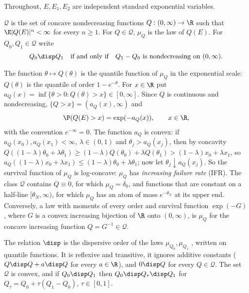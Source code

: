 Throughout, $E,E_1,E_2$ are independent standard exponential variables.

\begin{definition}\label{def:existence-Q}
$\mathcal{Q}$ is the set of concave nondecreasing functions $Q:(0,\infty)\to\R$ such that
$\E|Q(E)|^n<\infty$ for every $n\ge1$. For $Q\in\mathcal{Q}$, $\mu_Q$ is the law of $Q(E)$.
For $Q_0,Q_1\in\mathcal{Q}$ write
\[
  Q_0\disp Q_1\quad\text{if and only if}\quad Q_1-Q_0\text{ is nondecreasing on }(0,\infty).
\]
\end{definition}

The function $\theta\mapsto Q(\theta)$ is the quantile function of $\mu_Q$ in the exponential
scale: $Q(\theta)$ is the quantile of order $1-e^{-\theta}$. For $x\in\R$ put
$a_Q(x)=\inf\{\theta>0:Q(\theta)>x\}\in[0,\infty]$. Since $Q$ is continuous and nondecreasing,
$\{Q>x\}=(a_Q(x),\infty)$ and
\begin{equation}\label{eq:existence-survival}
  \P(Q(E)>x)=\exp(-a_Q(x)),\qquad x\in\R ,
\end{equation}
with the convention $e^{-\infty}=0$. The function $a_Q$ is convex: if
$a_Q(x_0),a_Q(x_1)<\infty$, $\lambda\in(0,1)$ and $\theta_j>a_Q(x_j)$, then by concavity
$Q((1-\lambda)\theta_0+\lambda\theta_1)\ge(1-\lambda)Q(\theta_0)+\lambda Q(\theta_1)
>(1-\lambda)x_0+\lambda x_1$, so
$a_Q((1-\lambda)x_0+\lambda x_1)\le(1-\lambda)\theta_0+\lambda\theta_1$; now let
$\theta_j\downarrow a_Q(x_j)$. So the survival function of $\mu_Q$ is log-concave: $\mu_Q$ has
\emph{increasing failure rate} (IFR). The class $\mathcal{Q}$ contains $Q\equiv0$, for which
$\mu_Q=\delta_0$, and functions that are constant on a half-line $[\theta_N,\infty)$, for which
$\mu_Q$ has an atom of mass $e^{-\theta_N}$ at its upper end. Conversely, a law with moments of every
order and survival function $\exp(-G)$, where $G$ is a convex increasing bijection of $\R$ onto
$(0,\infty)$, is $\mu_Q$ for the concave increasing function $Q=G^{-1}\in\mathcal{Q}$.

The relation $\disp$ is the dispersive order of the laws $\mu_{Q_0},\mu_{Q_1}$
\cite{ShakedShanthikumar07}, written on quantile functions. It is reflexive and transitive, it
ignores additive constants ($Q\disp Q+a\disp Q$ for every $a\in\R$), and $0\disp Q$ for every
$Q\in\mathcal{Q}$. The set $\mathcal{Q}$ is convex, and if $Q_0\disp Q_1$ then
$Q_0\disp Q_\tau\disp Q_1$ for $Q_\tau=Q_0+\tau(Q_1-Q_0)$, $\tau\in[0,1]$.

